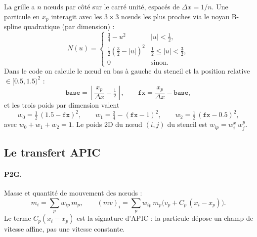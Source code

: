 \documentclass[11pt,a4paper]{article}
\newcommand{\code}[1]{\texttt{\detokenize{#1}}}
\begin{document}
La grille a $n$ n\oe uds par côté sur le carré unité, espacés de $\Delta x = 1/n$.
Une particule en $x_p$ interagit avec les $3\times 3$ n\oe uds les plus proches via le noyau
B-spline quadratique (par dimension) :
\[
  N(u) =
  \begin{cases}
    \tfrac34 - u^2 & |u| < \tfrac12,\\[2pt]
    \tfrac12\left(\tfrac32 - |u|\right)^2 & \tfrac12 \le |u| < \tfrac32,\\[2pt]
    0 & \text{sinon.}
  \end{cases}
\]
Dans le code on calcule le n\oe ud \code{base} en bas à gauche du stencil et la position
relative \code{fx} $\in [0.5, 1.5)^2$ :
\[
  \texttt{base} = \left\lfloor \frac{x_p}{\Delta x} - \tfrac12 \right\rfloor,\qquad
  \texttt{fx} = \frac{x_p}{\Delta x} - \texttt{base},
\]
et les trois poids par dimension valent
\[
  w_0 = \tfrac12\,(1.5 - \texttt{fx})^2,\qquad
  w_1 = \tfrac34 - (\texttt{fx} - 1)^2,\qquad
  w_2 = \tfrac12\,(\texttt{fx} - 0.5)^2,
\]
avec $w_0 + w_1 + w_2 = 1$. Le poids 2D du n\oe ud $(i,j)$ du stencil est $w_{ip} = w_i^x\, w_j^y$.

\begin{center}
\end{center}

\subsection{Le transfert APIC}

\paragraph{P2G.} Masse et quantité de mouvement des n\oe uds :
\[
  m_i = \sum_p w_{ip}\, m_p,\qquad
  (m v)_i = \sum_p w_{ip}\, m_p \big( v_p + C_p\,(x_i - x_p) \big).
\]
Le terme $C_p (x_i - x_p)$ est la signature d'APIC : la particule dépose un champ de vitesse
affine, pas une vitesse constante.
\end{document}
